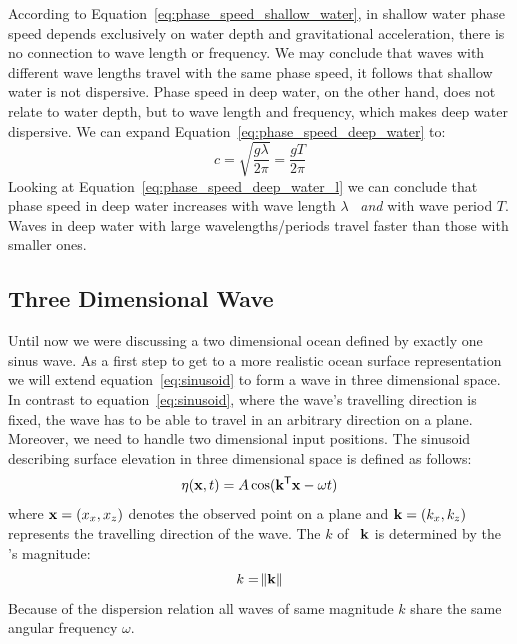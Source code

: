 %
According to Equation~\ref{eq:phase_speed_shallow_water}, in shallow water phase speed depends exclusively
on water depth and gravitational acceleration, there is no connection to wave length or frequency.
We may conclude that waves with different wave lengths travel with the same phase speed, it follows that
shallow water is not dispersive. Phase speed in deep water, on the other hand,
does not relate to water depth, but to wave length and frequency, which makes deep water dispersive.
We can expand Equation~\ref{eq:phase_speed_deep_water} to:
%
\begin{equation}
\label{eq:phase_speed_deep_water_l}
 c = \sqrt{\frac{g\lambda}{2\pi}} = \frac{gT}{2\pi}
\end{equation}
%
Looking at Equation~\ref{eq:phase_speed_deep_water_l} we can conclude that phase speed in deep water increases
with wave length $\lambda$ ~\emph{and} with wave period $T$. Waves in deep water with large wavelengths/periods
travel faster than those with smaller ones.
%
\subsection{Three Dimensional Wave}
Until now we were discussing a two dimensional ocean defined by exactly one sinus wave. As a first
step to get to a more realistic ocean surface representation we will extend equation~\ref{eq:sinusoid}
to form a wave in three dimensional space. In contrast to equation~\ref{eq:sinusoid}, where the wave's
travelling direction is fixed, the wave has to be able to travel in an arbitrary direction on a plane.
Moreover, we need to handle two dimensional input positions. The sinusoid describing surface elevation
in three dimensional space is defined as follows:
\begin{equation}
\label{eq:sinusoid_3d}
 \eta(\mathbf{x}, t) = A\cos(\mathbf{k}^{\mathsf{T}}\mathbf{x} - \omega t)
\end{equation}
where $\mathbf{x} = (x_x, x_z)$ denotes the observed point on a plane and $\mathbf{k} = (k_x, k_z)$ represents
the travelling direction of the wave. The \wavenumber $k$ of~\emph{\wavevector} $\mathbf{k}$ is determined by
the \wavevector's magnitude:
\begin{equation*}
 k = \norm{\mathbf{k}}
\end{equation*}
Because of the dispersion relation all waves of same magnitude $k$ share the same angular frequency $\omega$.

